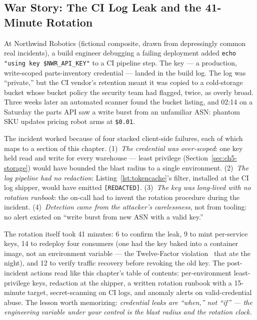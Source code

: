 \subsection{War Story: The CI Log Leak and the 41-Minute Rotation}

At Northwind Robotics (fictional composite, drawn from depressingly common
real incidents), a build engineer debugging a failing deployment added
\texttt{echo "using key \$NWR\_API\_KEY"} to a CI pipeline step. The key ---
a production, write-scoped parts-inventory credential --- landed in the
build log. The log was ``private,'' but the CI vendor's retention meant it
was copied to a cold-storage bucket whose bucket policy the security team
had flagged, twice, as overly broad. Three weeks later an automated scanner
found the bucket listing, and 02:14 on a Saturday the parts API saw a write
burst from an unfamiliar ASN: phantom SKU updates pricing robot arms at
\texttt{\$0.01}.

The incident worked because of four stacked client-side failures, each of
which maps to a section of this chapter. (1)~\emph{The credential was
over-scoped}: one key held read and write for every warehouse --- least
privilege (Section~\ref{sec:ch5-storage}) would have bounded the blast
radius to a single environment. (2)~\emph{The log pipeline had no redaction}:
Listing~\ref{lst:tokencache}'s filter, installed at the CI log shipper,
would have emitted \texttt{[REDACTED]}. (3)~\emph{The key was long-lived
with no rotation runbook}: the on-call had to invent the rotation procedure
during the incident. (4)~\emph{Detection came from the attacker's
carelessness}, not from tooling: no alert existed on ``write burst from new
ASN with a valid key.''

The rotation itself took 41 minutes: 6 to confirm the leak, 9 to mint
per-service keys, 14 to redeploy four consumers (one had the key baked into
a container image, not an environment variable --- the Twelve-Factor
violation~\cite{twelvefactor} that ate the night), and 12 to verify traffic
recovery before revoking the old key. The post-incident actions read like
this chapter's table of contents: per-environment least-privilege keys,
redaction at the shipper, a written rotation runbook with a 15-minute
target, secret-scanning on CI logs, and anomaly alerts on valid-credential
abuse. The lesson worth memorizing: \emph{credential leaks are ``when,''
not ``if'' --- the engineering variable under your control is the blast
radius and the rotation clock.}

